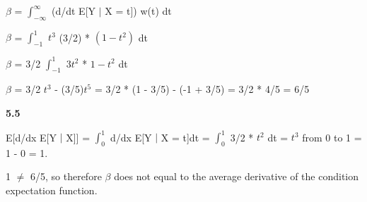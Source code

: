 $\beta$ = $\int_{-\infty}^{\infty}$ (d/dt E[Y $\mid$ X = t]) w(t) dt

$\beta$ = $\int_{-1}^{1}$ $t^{3}$ (3/2) * $(1 - t^{2})$ dt

$\beta$ = 3/2 $\int_{-1}^{1}$ $3t^{2}$ * $1 - t^{2}$ dt

$\beta$ = 3/2 $t^{3}$ - (3/5)$t^{5}$ = 3/2 * (1 - 3/5) - (-1 + 3/5) = 3/2 * 4/5 = 6/5

\textbf{5.5}

E[d/dx E[Y $\mid$ X]] = $\int_{0}^{1}$ d/dx E[Y $\mid$ X = t]dt =  $\int_{0}^{1}$ 3/2 * $t^2$ dt = $t^{3}$ from 0 to 1 = 1 - 0 = 1.

1 $\neq$ 6/5, so therefore $\beta$ does not equal to the average derivative of the condition expectation function.

